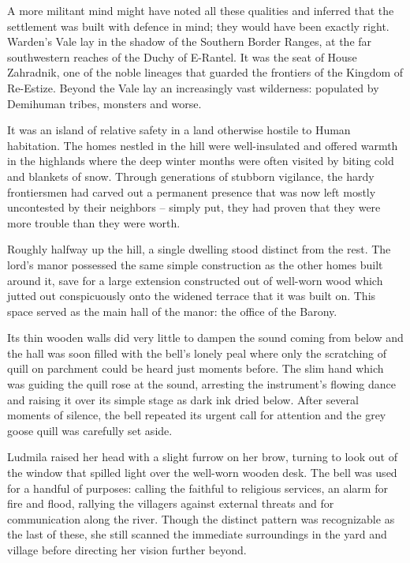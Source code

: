  

A more militant mind might have noted all these qualities and inferred that the settlement was built with defence in mind; they would have been exactly right. Warden’s Vale lay in the shadow of the Southern Border Ranges, at the far southwestern reaches of the Duchy of E-Rantel. It was the seat of House Zahradnik, one of the noble lineages that guarded the frontiers of the Kingdom of Re-Estize. Beyond the Vale lay an increasingly vast wilderness: populated by Demihuman tribes, monsters and worse.

 

It was an island of relative safety in a land otherwise hostile to Human habitation. The homes nestled in the hill were well-insulated and offered warmth in the highlands where the deep winter months were often visited by biting cold and blankets of snow. Through generations of stubborn vigilance, the hardy frontiersmen had carved out a permanent presence that was now left mostly uncontested by their neighbors – simply put, they had proven that they were more trouble than they were worth.

 

Roughly halfway up the hill, a single dwelling stood distinct from the rest. The lord’s manor possessed the same simple construction as the other homes built around it, save for a large extension constructed out of well-worn wood which jutted out conspicuously onto the widened terrace that it was built on. This space served as the main hall of the manor: the office of the Barony.

 

Its thin wooden walls did very little to dampen the sound coming from below and the hall was soon filled with the bell’s lonely peal where only the scratching of quill on parchment could be heard just moments before. The slim hand which was guiding the quill rose at the sound, arresting the instrument’s flowing dance and raising it over its simple stage as dark ink dried below. After several moments of silence, the bell repeated its urgent call for attention and the grey goose quill was carefully set aside.

 

Ludmila raised her head with a slight furrow on her brow, turning to look out of the window that spilled light over the well-worn wooden desk. The bell was used for a handful of purposes: calling the faithful to religious services, an alarm for fire and flood, rallying the villagers against external threats and for communication along the river. Though the distinct pattern was recognizable as the last of these, she still scanned the immediate surroundings in the yard and village before directing her vision further beyond.

